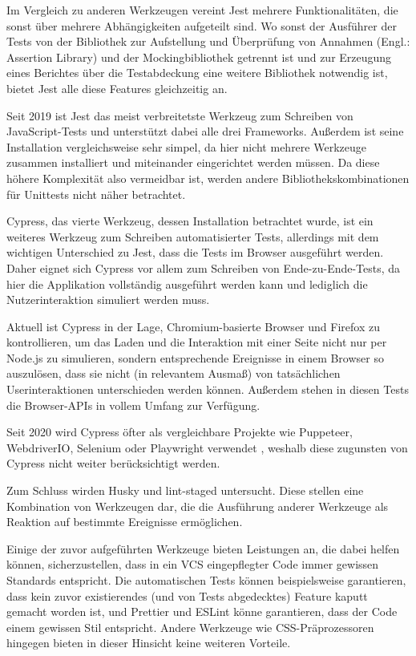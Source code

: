 Im Vergleich zu anderen Werkzeugen vereint Jest mehrere Funktionalitäten, die sonst über mehrere Abhängigkeiten aufgeteilt sind. Wo sonst der Ausführer der Tests von der Bibliothek zur Aufstellung und Überprüfung von Annahmen (Engl.: \glqq Assertion Library\grqq) und der Mockingbibliothek getrennt ist und zur Erzeugung eines Berichtes über die Testabdeckung eine weitere Bibliothek notwendig ist, bietet Jest alle diese Features gleichzeitig an.

Seit 2019 ist Jest das meist verbreitetste Werkzeug zum Schreiben von JavaScript-Tests \cite{stateofjs} und unterstützt dabei alle drei Frameworks. Außerdem ist seine Installation vergleichsweise sehr simpel, da hier nicht mehrere Werkzeuge zusammen installiert und miteinander eingerichtet werden müssen. Da diese höhere Komplexität also vermeidbar ist, werden andere Bibliothekskombinationen für Unittests nicht näher betrachtet.

Cypress, das vierte Werkzeug, dessen Installation betrachtet wurde, ist ein weiteres Werkzeug zum Schreiben automatisierter Tests, allerdings mit dem wichtigen Unterschied zu Jest, dass die Tests im Browser ausgeführt werden. Daher eignet sich Cypress vor allem zum Schreiben von Ende-zu-Ende-Tests, da hier die Applikation vollständig ausgeführt werden kann und lediglich die Nutzerinteraktion simuliert werden muss.

Aktuell ist Cypress in der Lage, Chromium-basierte Browser und Firefox zu kontrollieren, um das Laden und die Interaktion mit einer Seite nicht nur per Node.js zu simulieren, sondern entsprechende Ereignisse in einem Browser so auszulösen, dass sie nicht (in relevantem Ausmaß) von tatsächlichen Userinteraktionen unterschieden werden können. Außerdem stehen in diesen Tests die Browser-APIs in vollem Umfang zur Verfügung.

Seit 2020 wird Cypress öfter als vergleichbare Projekte wie Puppeteer, WebdriverIO, Selenium oder Playwright verwendet \cite{stateofjs}, weshalb diese zugunsten von Cypress nicht weiter berücksichtigt werden.

Zum Schluss wirden Husky und lint-staged untersucht. Diese stellen eine Kombination von Werkzeugen dar, die die Ausführung anderer Werkzeuge als Reaktion auf bestimmte Ereignisse ermöglichen.

Einige der zuvor aufgeführten Werkzeuge bieten Leistungen an, die dabei helfen können, sicherzustellen, dass in ein \gls{VCS} eingepflegter Code immer gewissen Standards entspricht. Die automatischen Tests können beispielsweise garantieren, dass kein zuvor existierendes (und von Tests abgedecktes) Feature kaputt gemacht worden ist, und Prettier und ESLint könne garantieren, dass der Code einem gewissen Stil entspricht. Andere Werkzeuge wie CSS-Präprozessoren hingegen bieten in dieser Hinsicht keine weiteren Vorteile.

